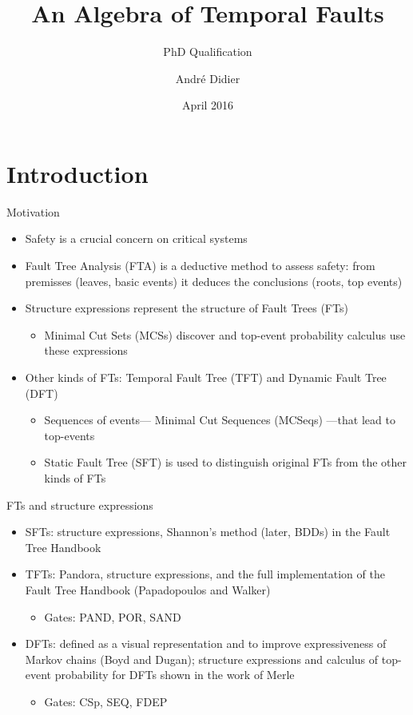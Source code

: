 \documentclass{beamer}
\title{An Algebra of Temporal Faults}
\subtitle{PhD Qualification}
\date{April 2016}
\author{André Didier}
\institute{
\inst{1}Federal University of Pernambuco\\
Centre of Informatics
}
\def\FTA{Fault Tree Analysis (FTA)\gdef\FTA{FTA\xspace}\xspace}
\def\FT{%
	Fault Tree (FT)%
	\gdef\FT{FT\xspace}%
	\gdef\FTs{FTs\xspace}%
	\gdef\IFT{An FT\xspace}%
	\xspace%
}
\def\FTs{%
	Fault Trees (FTs)%
	\gdef\FT{FT\xspace}%
	\gdef\FTs{FTs\xspace}%
	\gdef\IFT{An FT\xspace}%
	\xspace%
}
\def\IFT{%
	A Fault Tree (FT)%
	\gdef\FT{FT\xspace}%
	\gdef\FTs{FTs\xspace}%
	\gdef\IFT{An FT\xspace}%
	\xspace%
}
\def\MCS{%
	Minimal Cut Set (MCS)%
	\gdef\MCS{MCS\xspace}%
	\gdef\MCSs{MCSs\xspace}%
	\xspace%
}
\def\MCSs{%
	Minimal Cut Sets (MCSs)%
	\gdef\MCS{MCS\xspace}%
	\gdef\MCSs{MCSs\xspace}%
	\xspace%
}
\def\MCSeqs{%
	Minimal Cut Sequences (MCSeqs)%
	\gdef\MCS{MCSeq\xspace}%
	\gdef\MCSs{MCSeqs\xspace}%
	\xspace%
}
\def\SFT{%
	Static Fault Tree (SFT)%
	\gdef\SFT{SFT\xspace}%
	\gdef\SFTs{SFTs\xspace}%
	\xspace%
}
\def\SFTs{%
	Static Fault Trees (SFTs)%
	\gdef\SFT{SFT\xspace}%
	\gdef\SFTs{SFTs\xspace}%
	\xspace%
}
\def\TFT{%
	Temporal Fault Tree (TFT)%
	\gdef\TFT{TFT\xspace}%
	\gdef\TFTs{TFTs\xspace}%
	\xspace%
}
\def\TFTs{%
	Temporal Fault Trees (TFTs)%
	\gdef\TFT{TFT\xspace}%
	\gdef\TFTs{TFTs\xspace}%
	\xspace%
}
\def\DFT{%
	Dynamic Fault Tree (DFT)%
	\gdef\DFT{DFT\xspace}%
	\gdef\DFTs{DFTs\xspace}%
	\xspace%
}
\def\DFTs{%
	Dynamic Fault Trees (DFTs)%
	\gdef\DFT{DFT\xspace}%
	\gdef\DFTs{DFTs\xspace}%
	\xspace%
}
\begin{document}
\begin{frame}[label=title]
\titlepage
\end{frame}

\section{Introduction}
\begin{frame}{Motivation}
	\begin{itemize}
		\item Safety is a crucial concern on critical systems
		\item \FTA is a deductive method to assess safety: from premisses (leaves, basic events) it deduces the conclusions (roots, top events)
		\item Structure expressions represent the structure of \FTs
		\begin{itemize}
			\item \MCSs discover and top-event probability calculus use these expressions
		\end{itemize}
		\item Other kinds of \FTs: \TFT and \DFT
		\begin{itemize}
			\item Sequences of events---\MCSeqs---that lead to top-events
			\item \SFT is used to distinguish original \FTs from the other kinds of \FTs
		\end{itemize}
	\end{itemize}
\end{frame}

\begin{frame}{\FTs and structure expressions}
	\begin{itemize}
		\item \SFTs: structure expressions, Shannon's method (later, BDDs) in the Fault Tree Handbook
		\item \TFTs: Pandora, structure expressions, and the full implementation of the Fault Tree Handbook (Papadopoulos and Walker)
		\begin{itemize}
			\item Gates: PAND, POR, SAND
		\end{itemize}
		\item \DFTs: defined as a visual representation and to improve expressiveness of Markov chains (Boyd and Dugan); structure expressions and calculus of top-event probability for \DFTs shown in the work of Merle
		\begin{itemize}
			\item Gates: CSp, SEQ, FDEP
		\end{itemize}
	\end{itemize}
\end{frame}
\end{document}
